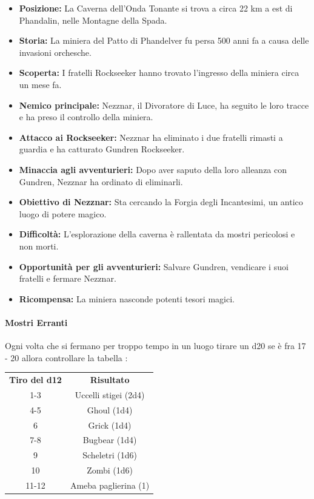 \documentclass{article}
\begin{document}
\begin{itemize}
    \item \textbf{Posizione:} La Caverna dell’Onda Tonante si trova a circa 22 km a est di Phandalin, nelle Montagne della Spada.
    \item \textbf{Storia:} La miniera del Patto di Phandelver fu persa 500 anni fa a causa delle invasioni orchesche.
    \item \textbf{Scoperta:} I fratelli Rockseeker hanno trovato l’ingresso della miniera circa un mese fa.
    \item \textbf{Nemico principale:} Nezznar, il Divoratore di Luce, ha seguito le loro tracce e ha preso il controllo della miniera.
    \item \textbf{Attacco ai Rockseeker:} Nezznar ha eliminato i due fratelli rimasti a guardia e ha catturato Gundren Rockseeker.
    \item \textbf{Minaccia agli avventurieri:} Dopo aver saputo della loro alleanza con Gundren, Nezznar ha ordinato di eliminarli.
    \item \textbf{Obiettivo di Nezznar:} Sta cercando la Forgia degli Incantesimi, un antico luogo di potere magico.
    \item \textbf{Difficoltà:} L'esplorazione della caverna è rallentata da mostri pericolosi e non morti.
    \item \textbf{Opportunità per gli avventurieri:} Salvare Gundren, vendicare i suoi fratelli e fermare Nezznar.
    \item \textbf{Ricompensa:} La miniera nasconde potenti tesori magici.
\end{itemize}

    \paragraph*{Mostri Erranti}
        Ogni volta che si fermano per troppo tempo in un luogo tirare un d20 se è fra 17 - 20 allora controllare la tabella : \\
        \begin{tabular}{|c|c|}
            \hline
            \textbf{Tiro del d12} & \textbf{Risultato} \\ 
            1-3 & Uccelli stigei (2d4) \\
            4-5 & Ghoul (1d4) \\
            6   & Grick (1d4) \\
            7-8 & Bugbear (1d4) \\
            9   & Scheletri (1d6) \\
            10  & Zombi (1d6) \\
            11-12 & Ameba paglierina (1) \\
            \hline
        \end{tabular}
    
\end{document}
